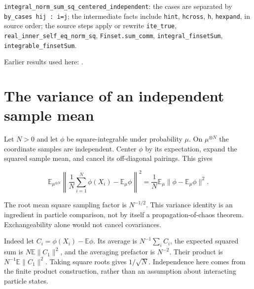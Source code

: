 \documentclass[11pt,a4paper]{article}
\begin{document}
\begin{leanbox}
\texttt{integral\_\allowbreak{}norm\_\allowbreak{}sum\_\allowbreak{}sq\_\allowbreak{}centered\_\allowbreak{}independent}: the cases are separated by \texttt{by\_\allowbreak{}cases hij : i=j}; the intermediate facts include \texttt{hint}, \texttt{hcross}, \texttt{h}, \texttt{hexpand}, in source order; the source steps apply or rewrite \texttt{ite\_\allowbreak{}true}, \texttt{real\_\allowbreak{}inner\_\allowbreak{}self\_\allowbreak{}eq\_\allowbreak{}norm\_\allowbreak{}sq}, \texttt{Finset.\allowbreak{}sum\_\allowbreak{}comm}, \texttt{integral\_\allowbreak{}finset\allowbreak{}Sum}, \texttt{integrable\_\allowbreak{}finset\allowbreak{}Sum}.
\end{leanbox}


Earlier results used here: \cite[Section~3.11.1]{LangevinLean2026IPLA}.

\section{\texorpdfstring{The variance of an independent sample mean}{The variance of an independent sample mean}}


Let \(N>0\) and let \(\phi\) be square-integrable under probability \(\mu\). On \(\mu^{\otimes N}\) the coordinate samples are independent. Center \(\phi\) by its expectation, expand the squared sample mean, and cancel its off-diagonal pairings. This gives

\[
\mathbb E_{\mu^{\otimes N}}
 \left\|\frac1N\sum_{i=1}^N\phi(X_i)-\mathbb E_\mu\phi\right\|^2
 =\frac1N\mathbb E_\mu\|\phi-\mathbb E_\mu\phi\|^2.
\]

The root mean square sampling factor is \(N^{-1/2}\). This variance identity is an ingredient in particle comparison, not by itself a propagation-of-chaos theorem. Exchangeability alone would not cancel covariances.



Indeed let \(C_i=\phi(X_i)-\mathbb E\phi\). Its average is \(N^{-1}\sum_iC_i\), the expected squared sum is \(N\mathbb E\|C_1\|^2\), and the averaging prefactor is \(N^{-2}\). Their product is \(N^{-1}\mathbb E\|C_1\|^2\). Taking square roots gives \(1/\sqrt N\). Independence here comes from the finite product construction, rather than an assumption about interacting particle states.
\end{document}
